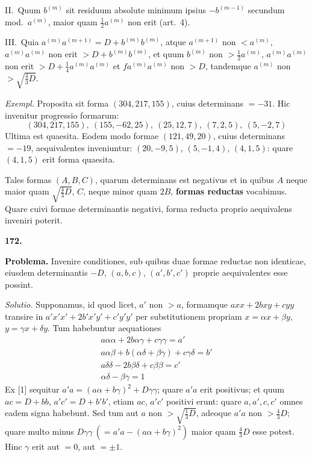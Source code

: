 \documentclass[12pt,a4paper]{article}
\theoremstyle{plain}
\theoremstyle{definition}
\theoremstyle{remark}
\begin{document}
II.\ Quum $b^{(m)}$ sit residuum absolute minimum ipsius $-b^{(m-1)}$ secundum mod.\ $a^{(m)}$, maior quam $\frac{1}{2}a^{(m)}$ non erit (art.\ 4).

III.\ Quia $a^{(m)}a^{(m+1)}=D+b^{(m)}b^{(m)}$, atque $a^{(m+1)}$ non $<a^{(m)}$, $a^{(m)}a^{(m)}$ non erit $>D+b^{(m)}b^{(m)}$, et quum $b^{(m)}$ non $>\frac{1}{2}a^{(m)}$, $a^{(m)}a^{(m)}$ non erit $>D+\frac{1}{4}a^{(m)}a^{(m)}$ et $fa^{(m)}a^{(m)}$ non $>D$, tandemque $a^{(m)}$ non $>\sqrt{\frac{4}{3}D}$.

\textit{Exempl.} Proposita sit forma $(304,217,155)$, cuius determinans $=-31$. Hic invenitur progressio formarum:
\[(304,217,155),\ (155,-62,25),\ (25,12,7),\ (7,2,5),\ (5,-2,7)\]
Ultima est quaesita. Eodem modo formae $(121,49,20)$, cuius determinans $=-19$, aequivalentes inveniuntur: $(20,-9,5)$, $(5,-1,4)$, $(4,1,5)$: quare $(4,1,5)$ erit forma quaesita.

Tales formas $(A,B,C)$, quarum determinans est negativus et in quibus $A$ neque maior quam $\sqrt{\frac{4}{3}D}$, $C$, neque minor quam $2B$, \textbf{formas reductas} vocabimus. Quare cuivi formae determinantis negativi, forma reducta proprio aequivalens inveniri poterit.

\textbf{172.}

\textbf{Problema.} Invenire conditiones, sub quibus duae formae reductae non identicae, eiusdem determinantis $-D$, $(a,b,c)$, $(a',b',c')$ proprie aequivalentes esse possint.

\textit{Solutio.} Supponamus, id quod licet, $a'$ non $>a$, formamque $axx+2bxy+cyy$ transire in $a'x'x'+2b'x'y'+c'y'y'$ per substitutionem propriam $x=\alpha x+\beta y$, $y=\gamma x+\delta y$. Tum habebuntur aequationes
\begin{gather*}
a\alpha\alpha+2b\alpha\gamma+c\gamma\gamma=a'\tag{[1]}\\
a\alpha\beta+b(\alpha\delta+\beta\gamma)+c\gamma\delta=b'\tag{[2]}\\
a\delta\delta-2b\beta\delta+c\beta\beta=c'\tag{[3]}\\
\alpha\delta-\beta\gamma=1\tag{[4]}
\end{gather*}
Ex [1] sequitur $a'a=(a\alpha+b\gamma)^2+D\gamma\gamma$; quare $a'a$ erit positivus; et quum $ac=D+bb$, $a'c'=D+b'b'$, etiam $ac$, $a'c'$ positivi erunt: quare $a,a',c,c'$ omnes eadem signa habebunt. Sed tum aut $a$ non $>\sqrt{\frac{1}{3}D}$, adeoque $a'a$ non $>\frac{4}{3}D$; quare multo minus $D\gamma\gamma\ (=a'a-(a\alpha+b\gamma)^2)$ maior quam $\frac{4}{3}D$ esse potest. Hinc $\gamma$ erit aut $=0$, aut $=\pm 1$.
\end{document}
